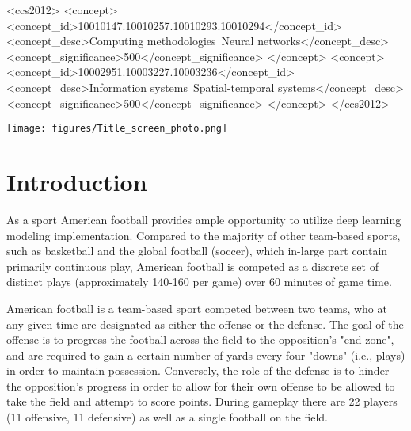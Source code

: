 \documentclass[sigconf]{acmart}
\begin{document}
\begin{CCSXML}
<ccs2012>
<concept>
<concept_id>10010147.10010257.10010293.10010294</concept_id>
<concept_desc>Computing methodologies~Neural networks</concept_desc>
<concept_significance>500</concept_significance>
</concept>
<concept>
<concept_id>10002951.10003227.10003236</concept_id>
<concept_desc>Information systems~Spatial-temporal systems</concept_desc>
<concept_significance>500</concept_significance>
</concept>
</ccs2012>
\end{CCSXML}


\begin{teaserfigure}
  \centering
  \texttt{[image: figures/Title\_screen\_photo.png]}
  \Description{}
  \label{fig:teaser}
\end{teaserfigure}


\maketitle

\section{Introduction}

As a sport American football provides ample opportunity to utilize deep learning modeling implementation. Compared to the majority of other team-based sports, such as basketball and the global football (soccer), which in-large part contain primarily continuous play, American football is competed as a discrete set of distinct plays (approximately 140-160 per game) over 60 minutes of game time.

American football is a team-based sport competed between two teams, who at any given time are designated as either the offense or the defense. The goal of the offense is to progress the football across the field to the opposition's "end zone", and are required to gain a certain number of yards every four "downs" (i.e., plays) in order to maintain possession. Conversely, the role of the defense is to hinder the opposition's progress in order to allow for their own offense to be allowed to take the field and attempt to score points. During gameplay there are 22 players (11 offensive, 11 defensive) as well as a single football on the field.  
\end{document}
